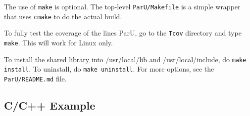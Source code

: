 \documentclass[12pt]{article}
\begin{document}
The use of \verb'make' is optional.  The top-level \verb'ParU/Makefile' is
a simple wrapper that uses \verb'cmake' to do the actual build.

To fully test the coverage of the lines ParU, go to the \verb'Tcov'
directory and type \verb'make'.  This will work for Linux only.

To install the shared library
into /usr/local/lib and /usr/local/include, do {\tt make install}.
To uninstall, do {\tt make uninstall}.
For more options, see the {\tt ParU/README.md} file.



\subsection{C/C++ Example}
\end{document}
